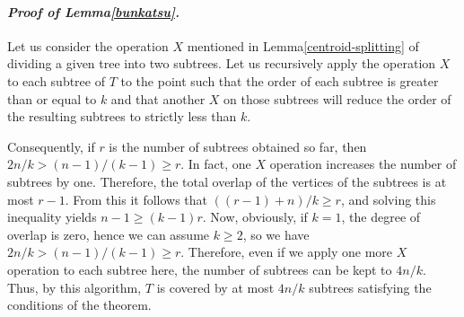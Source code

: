 \documentclass[letter,11pt]{article}
\newcommand{\white}{\qquad{\framebox{\rule{0pt}{4pt}}}}
\newcommand{\owari}{\hfill\white}
\theoremstyle{definition}
\theoremstyle{definition}
\newcommand{\1}{\boldmath$~1~$\unboldmath}
\newcommand{\qedgo}{\vspace{0.35cm}}
\newcommand{\tume}{\hspace*{0.2em}}
\newenvironment{Proofof}[1]{\expandafter
\paragraph{{\it Proof of #1.}}}{\hspace{5mm}\owari\qedgo}
\begin{document}

\begin{Proofof}{Lemma\tume\ref{bunkatsu}}
Let us consider the operation $X$ mentioned in Lemma\tume\ref{centroid-splitting} of dividing a given tree into two subtrees. 
Let us recursively apply the operation $X$ to each subtree of $T$ to the point such that the order of each subtree is greater than or equal to $k$ and that another $X$ on those subtrees will reduce the order of the resulting subtrees to strictly less than $k$.

Consequently, if $r$ is the number of subtrees obtained so far, then $2n/k > (n-1)/(k-1) \geq r$.
In fact, one $X$ operation increases the number of subtrees by one.
Therefore, the total overlap of the vertices of the subtrees is at most $r-1$.
From this it follows that $((r-1)+n)/k \geq r$, and solving this inequality yields $n-1 \geq (k-1)r$.
Now, obviously, if $k=1$, the degree of overlap is zero, hence we can assume $k \geq 2$, so we have $2n/k > (n-1)/(k-1) \geq r$.
Therefore, even if we apply one more $X$ operation to each subtree here, the number of subtrees can be kept to $4n/k$.
Thus, by this algorithm, $T$ is covered by at most $4n/k$ subtrees satisfying the conditions of the theorem.
\end{Proofof}
\end{document}
